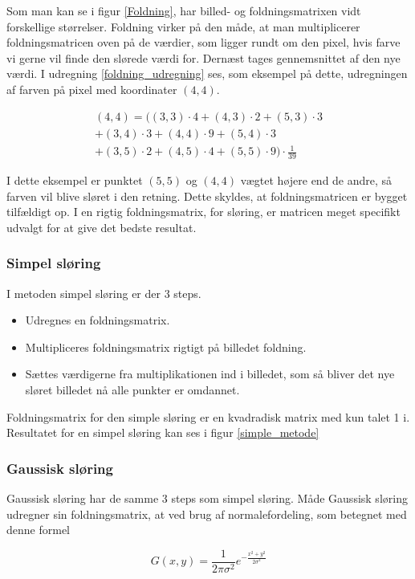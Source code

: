 {Som man kan se i figur \ref{Foldning}, har billed- og foldningsmatrixen
vidt forskellige størrelser. Foldning virker på den måde, at man
multiplicerer foldningsmatricen oven på de værdier, som ligger rundt om den pixel,
hvis farve vi gerne vil finde den slørede værdi for. Dernæst tages gennemsnittet af den
nye værdi. I udregning \ref{foldning_udregning} ses, som eksempel på
dette, udregningen af farven på pixel med koordinater $(4,4)$.

\begin{multline}
    (4,4) = ((3,3)\cdot 4+(4,3) \cdot 2+(5,3) \cdot 3\\
    + (3,4) \cdot 3+(4,4) \cdot 9+(5,4) \cdot 3\\
    + (3,5) \cdot 2+(4,5) \cdot 4+(5,5) \cdot 9) \cdot \frac{1}{39}
    \label{foldning_udregning}
\end{multline}

I dette eksempel er punktet $(5,5)$ og $(4,4)$ vægtet højere end de
andre, så farven vil blive sløret i den retning. Dette skyldes, at
foldningsmatricen er bygget tilfældigt op. I en rigtig foldningsmatrix,
for sløring, er matricen meget specifikt udvalgt for at give det bedste
resultat.

\subsubsection*{Simpel sløring}
I metoden simpel sløring er der 3 steps.
\begin{itemize}
	\item{Udregnes en foldningsmatrix.}
	\item{Multipliceres foldningsmatrix rigtigt på billedet foldning.}
	\item{Sættes værdigerne fra multiplikationen ind i billedet, som så bliver det nye sløret billedet nå
alle punkter er omdannet.}
\end{itemize}

Foldningsmatrix for den simple sløring er en kvadradisk matrix med kun
talet 1 i. Resultatet for en simpel sløring kan ses i figur
\ref{simple_metode}

\subsubsection*{Gaussisk sløring}
Gaussisk sløring har de samme 3 steps som simpel sløring. Måde Gaussisk
sløring udregner sin foldningsmatrix, at ved brug af normalefordeling,
som betegnet med denne formel

\begin{equation}
	G(x,y) = \frac{1}{2\pi\sigma^2}e^{-\frac{x^2+y^2}{2\sigma^2}}
\end{equation}

}
